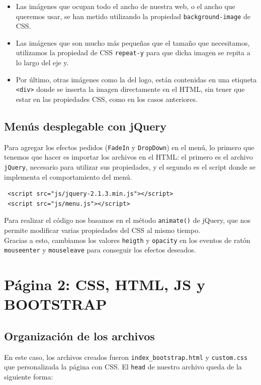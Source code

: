 \documentclass[10pt,a4paper]{article}
\begin{document}
\begin{itemize}

\item Las imágenes que ocupan todo el ancho de nuestra web, o el ancho que queremos usar, se han metido utilizando la propiedad \texttt{background-image} de CSS.

\item Las imágenes que son mucho más pequeñas que el tamaño que necesitamos, utilizamos la propiedad de CSS \texttt{repeat-y} para que dicha imagen se repita a lo largo del eje y.

\item Por último, otras imágenes como la del logo, están contenidas en una etiqueta \texttt{<div>} donde se inserta la imagen directamente en el HTML, sin tener que estar en las propiedades CSS, como en los casos anteriores. 

\end{itemize}

\subsection{Menús desplegable con jQuery}

Para agregar los efectos pedidos (\texttt{FadeIn} y \texttt{DropDown}) en el menú, lo primero que tenemos que hacer es importar los archivos en el HTML: el primero es el archivo \texttt{jQuery}, necesario para utilizar sus propiedades, y el segundo es el script donde se implementa el comportamiento del menú.

\begin{verbatim}
 <script src="js/jquery-2.1.3.min.js"></script>
 <script src="js/menu.js"></script>
\end{verbatim}
 
Para realizar el código nos basamos en el método \texttt{animate()} de jQuery, que nos permite modificar varias propiedades del CSS al mismo tiempo.\\

Gracias a esto, cambiamos los valores \texttt{heigth} y \texttt{opacity} en los eventos de ratón \texttt{mouseenter} y \texttt{mouseleave} para conseguir los efectos deseados.

\section{Página 2: CSS, HTML, JS y BOOTSTRAP}

\subsection{Organización de los archivos}
En este caso, los archivos creados fueron \texttt{index\_bootstrap.html} y \texttt{custom.css} que personalizada la página con CSS.
El \texttt{head} de nuestro archivo queda de la siguiente forma:\\
\end{document}
